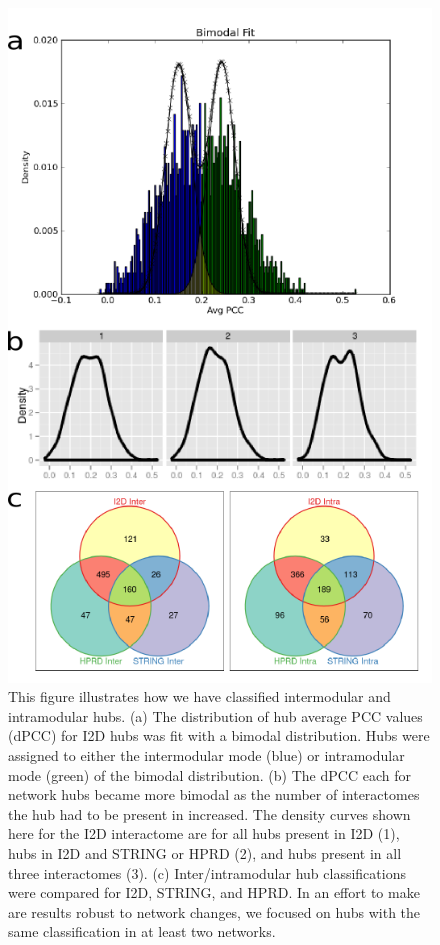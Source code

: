 \begin{figure}
\begin{center}
\includegraphics[scale=0.9]{figs/sysBio_1}
\end{center}
\caption[Establishing inter/intramodular hubs]{\small This figure
  illustrates how we have classified intermodular and intramodular
  hubs. (a) The distribution of hub average PCC values (dPCC) for I2D
  hubs was fit with a bimodal distribution. Hubs were assigned to
  either the intermodular mode (blue) or intramodular mode (green) of
  the bimodal distribution. (b) The dPCC each for network hubs became
  more bimodal as the number of interactomes the hub had to be present
  in increased. The density curves shown here for the I2D interactome
  are for all hubs present in I2D (1), hubs in I2D and STRING or HPRD
  (2), and hubs present in all three interactomes (3). (c)
  Inter/intramodular hub classifications were compared for I2D,
  STRING, and HPRD. In an effort to make are results robust to network
  changes, we focused on hubs with the same classification in at least
  two networks. \label{fig:sysBio:fig1}}
\end{figure}

